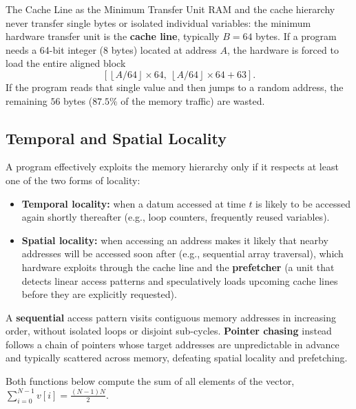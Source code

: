 \begin{noteblock}{The Cache Line as the Minimum Transfer Unit}
RAM and the cache hierarchy never transfer single bytes or isolated individual variables: the minimum hardware transfer unit is the \textbf{cache line}, typically $B = 64$ bytes. If a program needs a 64-bit integer ($8$ bytes) located at address $A$, the hardware is forced to load the entire aligned block
\[
\left[\left\lfloor A / 64 \right\rfloor \times 64,\ \left\lfloor A / 64 \right\rfloor \times 64 + 63\right].
\]
If the program reads that single value and then jumps to a random address, the remaining $56$ bytes ($87.5\%$ of the memory traffic) are wasted.
\end{noteblock}

\subsection{Temporal and Spatial Locality}

A program effectively exploits the memory hierarchy only if it respects at least one of the two forms of locality:

\begin{itemize}
    \item \textbf{Temporal locality:} when a datum accessed at time $t$ is likely to be accessed again shortly thereafter (e.g., loop counters, frequently reused variables).
    \item \textbf{Spatial locality:} when accessing an address makes it likely that nearby addresses will be accessed soon after (e.g., sequential array traversal), which hardware exploits through the cache line and the \textbf{prefetcher} (a unit that detects linear access patterns and speculatively loads upcoming cache lines before they are explicitly requested).
\end{itemize}

\begin{definition}
A \textbf{sequential} access pattern visits contiguous memory addresses in increasing order, without isolated loops or disjoint sub-cycles. \textbf{Pointer chasing} instead follows a chain of pointers whose target addresses are unpredictable in advance and typically scattered across memory, defeating spatial locality and prefetching.
\end{definition}

Both functions below compute the sum of all elements of the vector, $\sum_{i=0}^{N-1} v[i] = \frac{(N-1)N}{2}$.

